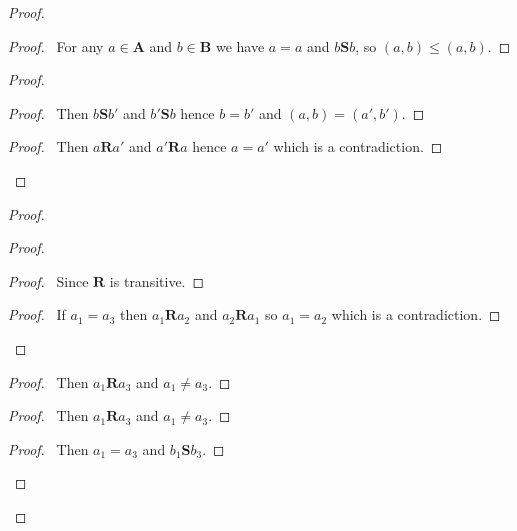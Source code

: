 \documentclass{book}
\let\qed\relax
\theoremstyle{definition}
\begin{document}
\begin{proof}
\pf
{}
\begin{proof}
	\pf\ For any $a \in \mathbf{A}$ and $b \in \mathbf{B}$ we have $a = a$ and $b \mathbf{S} b$, so $(a,b) \leq (a,b)$.
\end{proof}
\begin{proof}
	\begin{proof}
		\pf\ Then $b \mathbf{S} b'$ and $b' \mathbf{S} b$ hence $b = b'$ and $(a,b) = (a',b')$.
	\end{proof}
	\begin{proof}
		\pf\ Then $a \mathbf{R} a'$ and $a' \mathbf{R} a$ hence $a = a'$ which is a contradiction.
	\end{proof}
\end{proof}
\begin{proof}
	\begin{proof}
		\begin{proof}
			\pf\ Since $\mathbf{R}$ is transitive.
		\end{proof}
		\begin{proof}
			\pf\ If $a_1 = a_3$ then $a_1 \mathbf{R} a_2$ and $a_2 \mathbf{R} a_1$ so $a_1 = a_2$ which is a contradiction.
		\end{proof}
	\end{proof}
	\begin{proof}
		\pf\ Then $a_1 \mathbf{R} a_3$ and $a_1 \neq a_3$.
	\end{proof}
	\begin{proof}
		\pf\ Then $a_1 \mathbf{R} a_3$ and $a_1 \neq a_3$.
	\end{proof}
	\begin{proof}
		\pf\ Then $a_1 = a_3$ and $b_1 \mathbf{S} b_3$.
	\end{proof}
\end{proof}
\qed
\end{proof}
\end{document}
